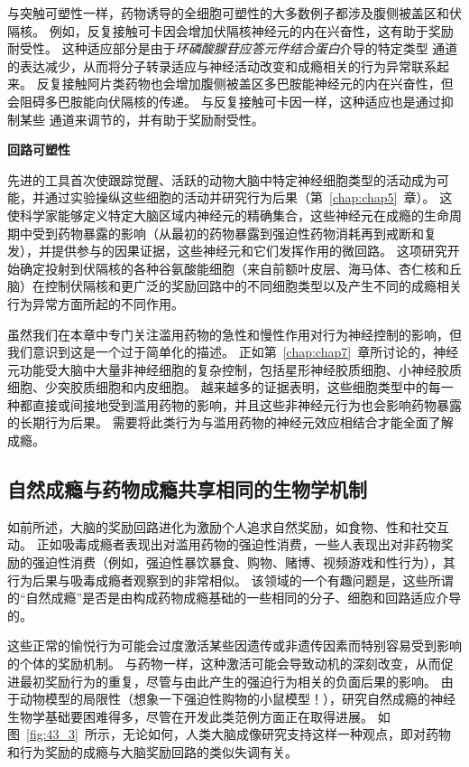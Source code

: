 与突触可塑性一样，药物诱导的全细胞可塑性的大多数例子都涉及腹侧被盖区和伏隔核。
例如，反复接触可卡因会增加伏隔核神经元的内在兴奋性，这有助于奖励耐受性。
这种适应部分是由于\textit{环磷酸腺苷应答元件结合蛋白}介导的特定类型  通道的表达减少，从而将分子转录适应与神经活动改变和成瘾相关的行为异常联系起来。
反复接触阿片类药物也会增加腹侧被盖区多巴胺能神经元的内在兴奋性，但会阻碍多巴胺能向伏隔核的传递。
与反复接触可卡因一样，这种适应也是通过抑制某些  通道来调节的，并有助于奖励耐受性。


\textbf{回路可塑性}

先进的工具首次使跟踪觉醒、活跃的动物大脑中特定神经细胞类型的活动成为可能，并通过实验操纵这些细胞的活动并研究行为后果（第~\ref{chap:chap5}~章）。
这使科学家能够定义特定大脑区域内神经元的精确集合，这些神经元在成瘾的生命周期中受到药物暴露的影响（从最初的药物暴露到强迫性药物消耗再到戒断和复发），并提供参与的因果证据，这些神经元和它们发挥作用的微回路。
这项研究开始确定投射到伏隔核的各种谷氨酸能细胞（来自前额叶皮层、海马体、杏仁核和丘脑）在控制伏隔核和更广泛的奖励回路中的不同细胞类型以及产生不同的成瘾相关行为异常方面所起的不同作用。


虽然我们在本章中专门关注滥用药物的急性和慢性作用对行为神经控制的影响，但我们意识到这是一个过于简单化的描述。
正如第~\ref{chap:chap7}~章所讨论的，神经元功能受大脑中大量非神经细胞的复杂控制，包括星形神经胶质细胞、小神经胶质细胞、少突胶质细胞和内皮细胞。
越来越多的证据表明，这些细胞类型中的每一种都直接或间接地受到滥用药物的影响，并且这些非神经元行为也会影响药物暴露的长期行为后果。
需要将此类行为与滥用药物的神经元效应相结合才能全面了解成瘾。



\subsection{自然成瘾与药物成瘾共享相同的生物学机制}

如前所述，大脑的奖励回路进化为激励个人追求自然奖励，如食物、性和社交互动。
正如吸毒成瘾者表现出对滥用药物的强迫性消费，一些人表现出对非药物奖励的强迫性消费（例如，强迫性暴饮暴食、购物、赌博、视频游戏和性行为），其行为后果与吸毒成瘾者观察到的非常相似。
该领域的一个有趣问题是，这些所谓的“自然成瘾”是否是由构成药物成瘾基础的一些相同的分子、细胞和回路适应介导的。


这些正常的愉悦行为可能会过度激活某些因遗传或非遗传因素而特别容易受到影响的个体的奖励机制。
与药物一样，这种激活可能会导致动机的深刻改变，从而促进最初奖励行为的重复，尽管与由此产生的强迫行为相关的负面后果的影响。
由于动物模型的局限性（想象一下强迫性购物的小鼠模型！），研究自然成瘾的神经生物学基础要困难得多，尽管在开发此类范例方面正在取得进展。
如图~\ref{fig:43_3}~所示，无论如何，人类大脑成像研究支持这样一种观点，即对药物和行为奖励的成瘾与大脑奖励回路的类似失调有关。



